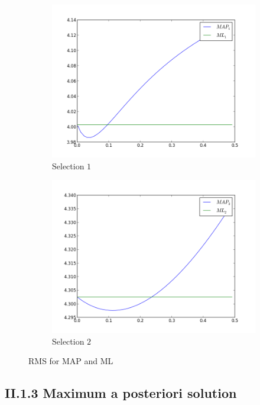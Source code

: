 \documentclass[a4paper,10pt]{article}
\begin{document}
\begin{figure}[H]
	\centering
	\begin{subfigure}{0.45\textwidth}
  		\centering
  		\includegraphics[width=\textwidth]{../images/report/rms_selection1.png}
  		\caption{Selection $1$}
  \end{subfigure}
  \begin{subfigure}{0.45\textwidth}
  		\centering
  		\includegraphics[width=\textwidth]{../images/report/rms_selection2.png}
  		\caption{Selection $2$}
  \end{subfigure}
  	\caption{RMS for MAP and ML}
\end{figure}

\subsection*{II.1.3 Maximum a posteriori solution}
\end{document}
